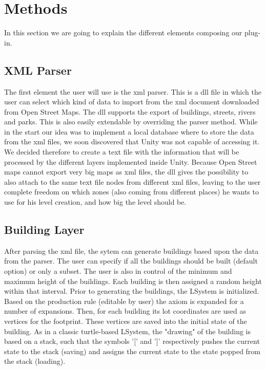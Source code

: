 \documentclass[conference]{IEEEtran}
\begin{document}
\section{Methods}

In this section we are going to explain the different elements composing our plug-in.

\subsection{XML Parser}

The first element the user will use is the xml parser. This is a dll file in which the user can select which kind of data to import from the xml document downloaded from Open Street Maps. The dll supports the export of buildings, streets, rivers and parks. This is also easily extendable by overriding the parser method.
While in the start our idea was to implement a local database where to store the data from the xml files, we soon discovered that Unity was not capable of accessing it. We decided therefore to create a text file with the information that will be processed by the different layers implemented inside Unity. Because Open Street maps cannot export very big maps as xml files, the dll gives the possibility to also attach to the same text file nodes from different xml files, leaving to the user complete freedom on which zones (also coming from different places) he wants to use for his level creation, and how big the level should be.

\subsection{Building Layer}
After parsing the xml file, the sytem can generate buildings based upon the data from the parser. The user can specify if all the buildings should be built (default option) or only a subset. The user is also in control of the minimum and maximum height of the buildings. Each building is then assigned a random height within that interval. Prior to generating the buildings, the LSystem is initialized. Based on the production rule (editable by user) the axiom is expanded for a number of expansions. Then, for each building its lot coordinates are used as vertices for the footprint. These vertices are saved into the initial state of the building. As in a classic turtle-based LSystem, the "drawing" of the building is based on a stack, such that the symbols '[' and ']' respectively pushes the current state to the stack (saving) and assigns the current state to the state popped from the stack (loading). \newline
\end{document}
